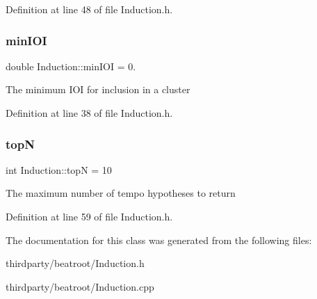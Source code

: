Definition at line 48 of file Induction.\+h.

\mbox{\label{class_induction_a79992fbf54461174a5b7113397210c0a}} 
\subsubsection{\texorpdfstring{min\+I\+OI}{minIOI}}
{\footnotesize\ttfamily double Induction\+::min\+I\+OI = 0.\hspace{0.3cm}{\ttfamily [static]}}

The minimum I\+OI for inclusion in a cluster 

Definition at line 38 of file Induction.\+h.

\mbox{\label{class_induction_ae128800b79984f390a9a00a7850e6f7d}} 
\subsubsection{\texorpdfstring{topN}{topN}}
{\footnotesize\ttfamily int Induction\+::topN = 10\hspace{0.3cm}{\ttfamily [static]}}

The maximum number of tempo hypotheses to return 

Definition at line 59 of file Induction.\+h.



The documentation for this class was generated from the following files\+:\begin{DoxyCompactItemize}
\item 
thirdparty/beatroot/Induction.\+h\item 
thirdparty/beatroot/Induction.\+cpp\end{DoxyCompactItemize}
